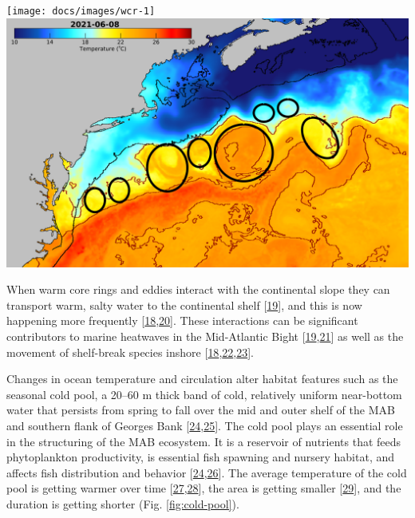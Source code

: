\documentclass[
  10pt,
]{article}
\let\origfigure\figure
\let\endorigfigure\endfigure
\renewenvironment{figure}[1][2] {
    \expandafter\origfigure\expandafter[H]
} {
    \endorigfigure
}
\begin{document}
\begin{figure}

{\centering \texttt{[image: docs/images/wcr-1]} \includegraphics[width=0.49\linewidth]{images/D_20210608-MUR-SST-WCR} 

}

\caption{Warm core ring formation on the Northeast U.S. Shelf: Annual number of rings (left) and June 2021 rings (right), where the black line is the 200 m isobath (the shelf break) and the red lines are the 20 and 24 degree isotherms.}\label{fig:wcr}
\end{figure}

When warm core rings and eddies interact with the continental slope they
can transport warm, salty water to the continental shelf
{[}\protect\hyperlink{ref-chen_mesoscale_2022}{19}{]}, and this is now
happening more frequently
{[}\protect\hyperlink{ref-gawarkiewicz_changing_2018}{18},\protect\hyperlink{ref-gawarkiewicz_increasing_nodate}{20}{]}.
These interactions can be significant contributors to marine heatwaves
in the Mid-Atlantic Bight
{[}\protect\hyperlink{ref-chen_mesoscale_2022}{19},\protect\hyperlink{ref-gawarkiewicz_characteristics_2019}{21}{]}
as well as the movement of shelf-break species inshore
{[}\protect\hyperlink{ref-gawarkiewicz_changing_2018}{18},\protect\hyperlink{ref-potter_horizontal_2011}{22},\protect\hyperlink{ref-worm_predator_2003}{23}{]}.

Changes in ocean temperature and circulation alter habitat features such
as the seasonal cold pool, a 20--60 m thick band of cold, relatively
uniform near-bottom water that persists from spring to fall over the mid
and outer shelf of the MAB and southern flank of Georges Bank
{[}\protect\hyperlink{ref-lentz_seasonal_2017}{24},\protect\hyperlink{ref-chen_seasonal_2018}{25}{]}.
The cold pool plays an essential role in the structuring of the MAB
ecosystem. It is a reservoir of nutrients that feeds phytoplankton
productivity, is essential fish spawning and nursery habitat, and
affects fish distribution and behavior
{[}\protect\hyperlink{ref-lentz_seasonal_2017}{24},\protect\hyperlink{ref-miles_offshore_2021}{26}{]}.
The average temperature of the cold pool is getting warmer over time
{[}\protect\hyperlink{ref-miller_state-space_2016}{27},\protect\hyperlink{ref-du_pontavice_incorporating_nodate}{28}{]},
the area is getting smaller
{[}\protect\hyperlink{ref-friedland_middle_2022}{29}{]}, and the
duration is getting shorter (Fig. \ref{fig:cold-pool}).
\end{document}

